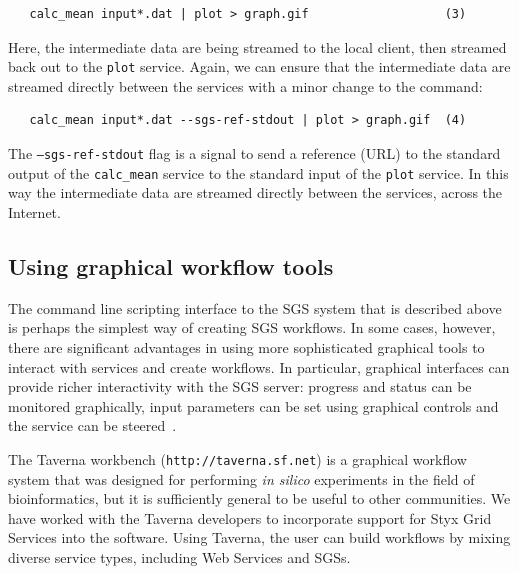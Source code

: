 \documentclass{llncs}
\begin{document}
\begin{verbatim}
   calc_mean input*.dat | plot > graph.gif                   (3)
\end{verbatim}

Here, the intermediate data are being streamed to the local client, then streamed back out to the {\tt plot} service.  Again, we can ensure that the intermediate data are streamed directly between the services with a minor change to the command:

\begin{verbatim}
   calc_mean input*.dat --sgs-ref-stdout | plot > graph.gif  (4)
\end{verbatim}

The {\tt --sgs-ref-stdout} flag is a signal to send a reference (URL) to the standard output of the {\tt calc\_mean} service to the standard input of the {\tt plot} service.  In this way the intermediate data are streamed directly between the services, across the Internet.

\subsection{Using graphical workflow tools}\label{subsec:graphical-workflow}
The command line scripting interface to the SGS system that is described above is perhaps the simplest way of creating SGS workflows.  In some cases, however, there are significant advantages in using more sophisticated graphical tools to interact with services and create workflows.  In particular, graphical interfaces can provide richer interactivity with the SGS server: progress and status can be monitored graphically, input parameters can be set using graphical controls and the service can be steered~\cite{blower:2005}.

The Taverna workbench ({\tt http://taverna.sf.net}) is a graphical workflow system that was designed for performing {\it in silico} experiments in the field of bioinformatics, but it is sufficiently general to be useful to other communities.  We have worked with the Taverna developers to incorporate support for Styx Grid Services into the software.  Using Taverna, the user can build workflows by mixing diverse service types, including Web Services and SGSs.
\end{document}
